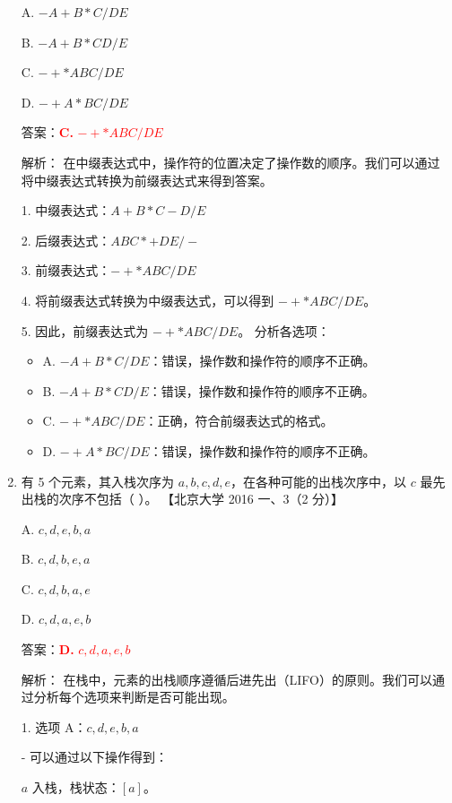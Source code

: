\documentclass[lang=cn,newtx,10pt,scheme=chinese]{../../../elegantbook}
\begin{document}
\begin{enumerate}
    A. $-A+B*C/DE$  

    B. $-A+B*CD/E$  

    C. $-+*ABC/DE$  

    D. $-+A*BC/DE$  

    答案：\textcolor{red}{\textbf{C.} $-+*ABC/DE$}

    解析：
    在中缀表达式中，操作符的位置决定了操作数的顺序。我们可以通过将中缀表达式转换为前缀表达式来得到答案。

    1. 中缀表达式：$A + B * C - D / E$

    2. 后缀表达式：$A B C * + D E / -$

    3. 前缀表达式：$- + * A B C / D E$

    4. 将前缀表达式转换为中缀表达式，可以得到 $- + * A B C / D E$。

    5. 因此，前缀表达式为 $- + * A B C / D E$。
    分析各选项：
    \begin{itemize}
        \item A. $-A+B*C/DE$：错误，操作数和操作符的顺序不正确。
        
        \item B. $-A+B*CD/E$：错误，操作数和操作符的顺序不正确。
        
        \item C. $-+*ABC/DE$：正确，符合前缀表达式的格式。
        
        \item D. $-+A*BC/DE$：错误，操作数和操作符的顺序不正确。
        \end{itemize}

    \item 有 5 个元素，其入栈次序为 $a, b, c, d, e$，在各种可能的出栈次序中，以 $c$ 最先出栈的次序不包括（ ）。  
    【北京大学 2016 一、3（2 分）】  

    A. $c, d, e, b, a$  

    B. $c, d, b, e, a$  

    C. $c, d, b, a, e$  

    D. $c, d, a, e, b$  

    答案：\textcolor{red}{\textbf{D.} $c, d, a, e, b$}

    解析：
    在栈中，元素的出栈顺序遵循后进先出（LIFO）的原则。我们可以通过分析每个选项来判断是否可能出现。

    1. 选项 A：$c, d, e, b, a$  

       - 可以通过以下操作得到：
    
            $a$ 入栈，栈状态：$[a]$。


\end{enumerate}
\end{document}
